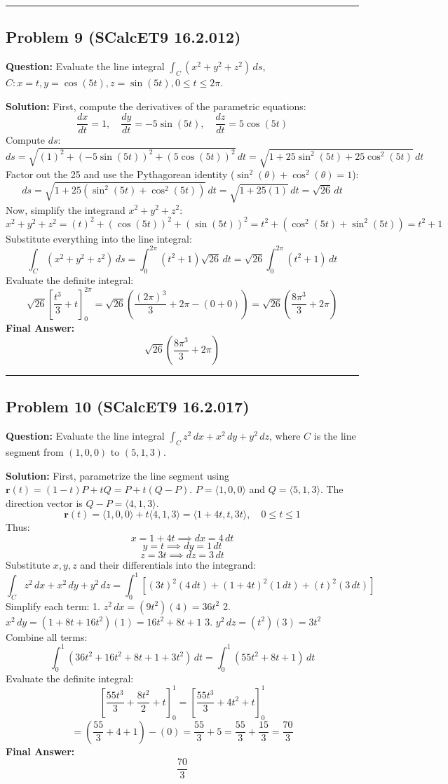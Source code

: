 \documentclass{article}
\begin{document}
\hrule \vspace{0.5cm}

\subsection{Problem 9 (SCalcET9 16.2.012)}
\textbf{Question:} Evaluate the line integral $\int_C (x^2 + y^2 + z^2) \, ds$, $C: x = t, y = \cos(5t), z = \sin(5t), 0 \leq t \leq 2\pi$.

\textbf{Solution:}
First, compute the derivatives of the parametric equations:
\[ \frac{dx}{dt} = 1, \quad \frac{dy}{dt} = -5\sin(5t), \quad \frac{dz}{dt} = 5\cos(5t) \]
Compute $ds$:
\[ ds = \sqrt{(1)^2 + (-5\sin(5t))^2 + (5\cos(5t))^2} \, dt = \sqrt{1 + 25\sin^2(5t) + 25\cos^2(5t)} \, dt \]
Factor out the 25 and use the Pythagorean identity ($\sin^2(\theta) + \cos^2(\theta) = 1$):
\[ ds = \sqrt{1 + 25(\sin^2(5t) + \cos^2(5t))} \, dt = \sqrt{1 + 25(1)} \, dt = \sqrt{26} \, dt \]
Now, simplify the integrand $x^2 + y^2 + z^2$:
\[ x^2 + y^2 + z^2 = (t)^2 + (\cos(5t))^2 + (\sin(5t))^2 = t^2 + (\cos^2(5t) + \sin^2(5t)) = t^2 + 1 \]
Substitute everything into the line integral:
\[ \int_C (x^2 + y^2 + z^2) \, ds = \int_0^{2\pi} (t^2 + 1)\sqrt{26} \, dt = \sqrt{26} \int_0^{2\pi} (t^2 + 1) \, dt \]
Evaluate the definite integral:
\[ \sqrt{26} \left[ \frac{t^3}{3} + t \right]_0^{2\pi} = \sqrt{26} \left( \frac{(2\pi)^3}{3} + 2\pi - (0 + 0) \right) = \sqrt{26} \left( \frac{8\pi^3}{3} + 2\pi \right) \]
\textbf{Final Answer:} 
\[ \sqrt{26} \left( \frac{8\pi^3}{3} + 2\pi \right) \]

\hrule \vspace{0.5cm}

\subsection{Problem 10 (SCalcET9 16.2.017)}
\textbf{Question:} Evaluate the line integral $\int_C z^2 \, dx + x^2 \, dy + y^2 \, dz$, where $C$ is the line segment from $(1,0,0)$ to $(5,1,3)$.

\textbf{Solution:}
First, parametrize the line segment using $\mathbf{r}(t) = (1-t)P + tQ = P + t(Q-P)$.
$P = \langle 1,0,0 \rangle$ and $Q = \langle 5,1,3 \rangle$. The direction vector is $Q - P = \langle 4,1,3 \rangle$.
\[ \mathbf{r}(t) = \langle 1,0,0 \rangle + t\langle 4,1,3 \rangle = \langle 1+4t, t, 3t \rangle, \quad 0 \leq t \leq 1 \]
Thus:
\[ x = 1+4t \implies dx = 4 \, dt \]
\[ y = t \implies dy = 1 \, dt \]
\[ z = 3t \implies dz = 3 \, dt \]
Substitute $x, y, z$ and their differentials into the integrand:
\[ \int_C z^2 \, dx + x^2 \, dy + y^2 \, dz = \int_0^1 \left[ (3t)^2 (4 \, dt) + (1+4t)^2 (1 \, dt) + (t)^2 (3 \, dt) \right] \]
Simplify each term:
1. $z^2 \, dx = (9t^2)(4) = 36t^2$
2. $x^2 \, dy = (1 + 8t + 16t^2)(1) = 16t^2 + 8t + 1$
3. $y^2 \, dz = (t^2)(3) = 3t^2$
Combine all terms:
\[ \int_0^1 (36t^2 + 16t^2 + 8t + 1 + 3t^2) \, dt = \int_0^1 (55t^2 + 8t + 1) \, dt \]
Evaluate the definite integral:
\[ \left[ \frac{55t^3}{3} + \frac{8t^2}{2} + t \right]_0^1 = \left[ \frac{55t^3}{3} + 4t^2 + t \right]_0^1 \]
\[ = \left( \frac{55}{3} + 4 + 1 \right) - (0) = \frac{55}{3} + 5 = \frac{55}{3} + \frac{15}{3} = \frac{70}{3} \]
\textbf{Final Answer:} 
\[ \frac{70}{3} \]
\end{document}
